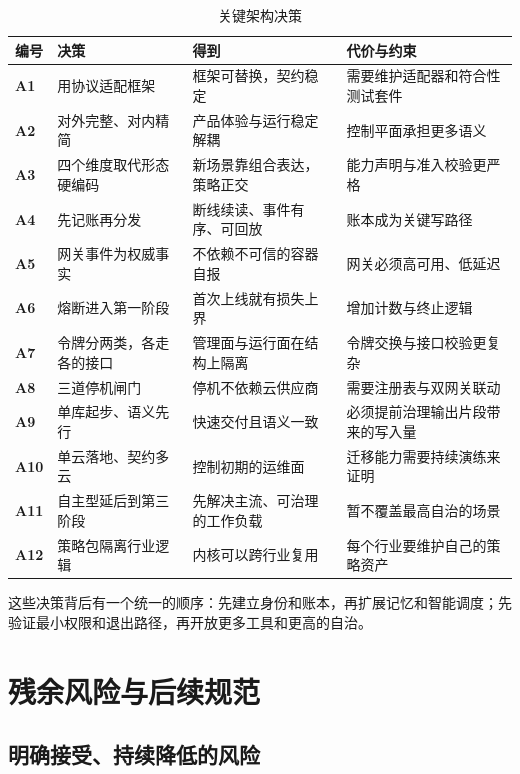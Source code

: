 \begin{table}[htbp]
\centering
\caption{关键架构决策}
\label{tab:adr}
\begin{tabularx}{\textwidth}{@{}>{\bfseries}L{1.0cm}L{4.0cm}L{4.6cm}Y@{}}
  \toprule
  \textbf{编号} & \textbf{决策} & \textbf{得到} & \textbf{代价与约束}\\
  \midrule
  A1 & 用协议适配框架 & 框架可替换，契约稳定 & 需要维护适配器和符合性测试套件\\
  A2 & 对外完整、对内精简 & 产品体验与运行稳定解耦 & 控制平面承担更多语义\\
  A3 & 四个维度取代形态硬编码 & 新场景靠组合表达，策略正交 & 能力声明与准入校验更严格\\
  A4 & 先记账再分发 & 断线续读、事件有序、可回放 & 账本成为关键写路径\\
  A5 & 网关事件为权威事实 & 不依赖不可信的容器自报 & 网关必须高可用、低延迟\\
  A6 & 熔断进入第一阶段 & 首次上线就有损失上界 & 增加计数与终止逻辑\\
  A7 & 令牌分两类，各走各的接口 & 管理面与运行面在结构上隔离 & 令牌交换与接口校验更复杂\\
  A8 & 三道停机闸门 & 停机不依赖云供应商 & 需要注册表与双网关联动\\
  A9 & 单库起步、语义先行 & 快速交付且语义一致 & 必须提前治理输出片段带来的写入量\\
  A10 & 单云落地、契约多云 & 控制初期的运维面 & 迁移能力需要持续演练来证明\\
  A11 & 自主型延后到第三阶段 & 先解决主流、可治理的工作负载 & 暂不覆盖最高自治的场景\\
  A12 & 策略包隔离行业逻辑 & 内核可以跨行业复用 & 每个行业要维护自己的策略资产\\
  \bottomrule
\end{tabularx}
\end{table}

这些决策背后有一个统一的顺序：先建立身份和账本，再扩展记忆和智能调度；先验证最小权限和退出路径，再开放更多工具和更高的自治。

\section{残余风险与后续规范}
\label{sec:risks}

\subsection{明确接受、持续降低的风险}

